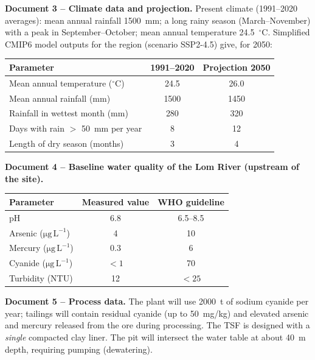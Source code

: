\documentclass[11pt]{article}
\begin{document}
\textbf{Document 3 -- Climate data and projection.} Present climate (1991--2020 averages): mean annual rainfall \SI{1500}{mm}; a long rainy season (March--November) with a peak in September--October; mean annual temperature \SI{24.5}{\ensuremath{{}^{\circ}\mathrm{C}}}. Simplified CMIP6 model outputs for the region (scenario SSP2-4.5) give, for 2050:

\begin{center}
\begin{tabular}{|l|c|c|}
\hline
\rowcolor{popblueL} \textbf{Parameter} & \textbf{1991--2020} & \textbf{Projection 2050} \\
\hline
Mean annual temperature ($^{\circ}\mathrm{C}$) & 24.5 & 26.0 \\
\hline
Mean annual rainfall (mm) & 1500 & 1450 \\
\hline
Rainfall in wettest month (mm) & 280 & 320 \\
\hline
Days with rain $>$ \SI{50}{mm} per year & 8 & 12 \\
\hline
Length of dry season (months) & 3 & 4 \\
\hline
\end{tabular}
\end{center}

\textbf{Document 4 -- Baseline water quality of the Lom River (upstream of the site).}

\begin{center}
\begin{tabular}{|l|c|c|}
\hline
\rowcolor{popblueL} \textbf{Parameter} & \textbf{Measured value} & \textbf{WHO guideline} \\
\hline
pH & 6.8 & 6.5--8.5 \\
\hline
Arsenic ($\mathrm{\mu g\,L^{-1}}$) & 4 & 10 \\
\hline
Mercury ($\mathrm{\mu g\,L^{-1}}$) & 0.3 & 6 \\
\hline
Cyanide ($\mathrm{\mu g\,L^{-1}}$) & $<1$ & 70 \\
\hline
Turbidity (NTU) & 12 & $<25$ \\
\hline
\end{tabular}
\end{center}

\textbf{Document 5 -- Process data.} The plant will use \SI{2000}{t} of sodium cyanide per year; tailings will contain residual cyanide (up to \SI{50}{mg/kg}) and elevated arsenic and mercury released from the ore during processing. The TSF is designed with a \emph{single} compacted clay liner. The pit will intersect the water table at about \SI{40}{m} depth, requiring pumping (dewatering).
\end{document}
